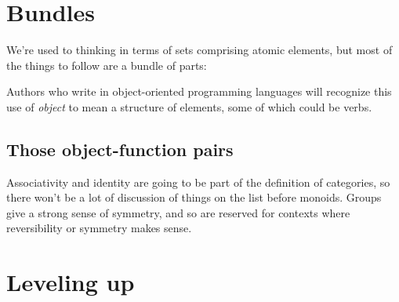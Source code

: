 \documentclass[11pt]{article}
\begin{document}


\section{Bundles}
We're used to thinking in terms of sets comprising atomic elements, but
most of the things to follow are a bundle of parts:


Authors who write in object-oriented programming languages will recognize this
use of {\em object} to mean a structure of elements, some of which could be verbs.

\subsection{Those object-function pairs}


Associativity and identity are going to be part of the definition of categories,
so there won't be a lot of discussion of things on the list before monoids.
Groups give a strong sense of symmetry, and so are reserved for contexts where
reversibility or symmetry makes sense.

\section{Leveling up}
\end{document}
